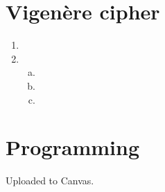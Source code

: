 \documentclass{article}
\begin{document}
\section{Vigen\`ere cipher}
\begin{enumerate}
\item

\item
\begin{enumerate}[a)]
\item
\item
\item
\end{enumerate}
\end{enumerate}


\section{Programming}
Uploaded to Canvas.
\end{document}
